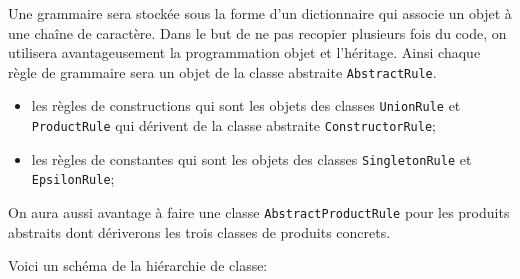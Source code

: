 \documentclass[11pt]{article}
\begin{document}
Une grammaire sera stockée sous la forme d'un dictionnaire qui associe un
objet à une chaîne de caractère. Dans le but de ne pas recopier plusieurs fois
du code, on utilisera avantageusement la programmation objet et
l'héritage. Ainsi chaque règle de grammaire sera un objet de la classe
abstraite \texttt{AbstractRule}.
\begin{itemize}
\item les règles de constructions qui sont les objets des classes
  \texttt{UnionRule} et \texttt{ProductRule} qui dérivent de la classe abstraite
  \texttt{ConstructorRule};\smallskip
\item les règles de constantes qui sont les objets des classes
  \texttt{SingletonRule} et \texttt{EpsilonRule};
\end{itemize}
On aura aussi avantage à faire une classe
\texttt{AbstractProductRule} pour les produits abstraits dont dériverons les
trois classes de produits concrets.


\pagebreak

Voici un schéma de la
hiérarchie de classe: \bigskip

\begin{center}
\end{center}
\smallskip
\end{document}
